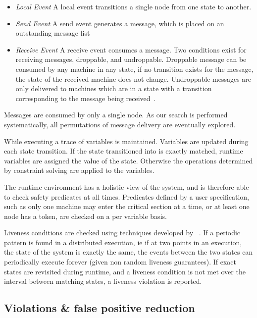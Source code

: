 \begin{itemize}

    \item\emph{Local Event} A local event transitions a single node from one state to another.

    \item\emph{Send Event} A send event generates a message, which is placed on an outstanding message list

    \item\emph{Receive Event} A receive event consumes a message. Two conditions
        exist for receiving messages, droppable, and undroppable. Droppable
        message can be consumed by any machine in any state, if no transition
        exists for the message, the state of the received machine does not
        change. Undroppable messages are only delivered to machines which are in
        a state with a transition corresponding to the message being
        received~\cite{yang_modist_nsdi09}.

\end{itemize}


Messages are consumed by only a single node. As our search is performed
systematically, all permutations of message delivery are eventually explored. 

While executing a trace of variables is maintained. Variables are updated during
each state transition. If the state transitioned into is exactly matched,
runtime variables are assigned the value of the state. Otherwise the operations
determined by constraint solving are applied to the variables.

The runtime environment has a holistic view of the system, and is therefore
able to check safety predicates at all times. Predicates defined by a user
specification, such as only one machine may enter the critical section at a
time, or at least one node has a token, are checked on a per variable basis.

Liveness conditions are checked using techniques developed by
~\cite{Garg:2014:MAS:2580115.2580404}. If a periodic pattern is found in a
distributed execution, ie if at two points in an execution, the state of the
system is exactly the same, the events between the two states can periodically
execute forever (given non random liveness guarantees). If exact states are
revisited during runtime, and a liveness condition is not met over the interval
between matching states, a liveness violation is reported.

\subsection{Violations \& false positive reduction}

